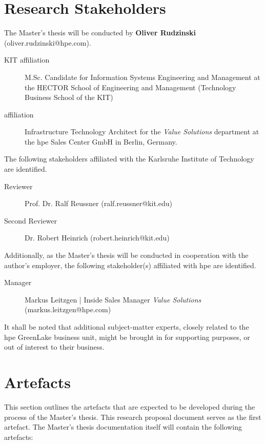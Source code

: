 	\section{Research Stakeholders} \label{sec:organization-stakeholders}
	
	The Master's thesis will be conducted by \textbf{Oliver Rudzinski} (oliver.rudzinski@hpe.com).
	\begin{description}
		\item[KIT affiliation] M.Sc. Candidate for Information Systems Engineering and Management at the HECTOR School of Engineering and Management (Technology Business School of the KIT)
		\item[ affiliation] Infrastructure Technology Architect for the \textit{Value Solutions} department at the \acl{hpe} Sales Center GmbH in Berlin, Germany. 
	\end{description}
	
	The following stakeholders affiliated with the Karlsruhe Institute of Technology are identified.
		
	\begin{description}
		\item[Reviewer] Prof. Dr. Ralf Reussner (ralf.reussner@kit.edu)
		\item[Second Reviewer] Dr. Robert Heinrich (robert.heinrich@kit.edu)
	\end{description}
	
	Additionally, as the Master's thesis will be conducted in cooperation with the author's employer, the following stakeholder(s) affiliated with \ac{hpe} are identified.
	
	\begin{description}
		\item[Manager] Markus Leitzgen | Inside Sales Manager \textit{Value Solutions} (markus.leitzgen@hpe.com) 
	\end{description}
	
	It shall be noted that additional subject-matter experts, closely related to the \ac{hpe} GreenLake business unit, might be brought in for supporting purposes, or out of interest to their business.	


	\section{Artefacts} \label{sec:organization-deliverables}
	This section outlines the artefacts that are expected to be developed during the process of the Master's thesis. This research proposal document serves as the first artefact. The Master's thesis documentation itself will contain the following artefacts:
	
